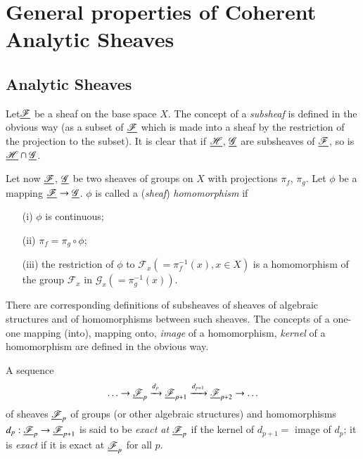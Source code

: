 \chapter{General properties of Coherent Analytic Sheaves}\label{chap12}

\section{Analytic Sheaves}\label{chap12:sec1}

Let\pageoriginale $\underline{\mathscr{F}}$ be a sheaf on the base space
$X$. The concept of a 
\textit{subsheaf} is defined in the obvious way (as a subset of
$\underline{\mathscr{F}}$ which is made into a sheaf by the restriction of the
projection to the subset). It is clear that if $\underline{\mathscr{H}}$,
$\underline{\mathscr{G}}$ are subsheaves of $\underline{\mathscr{F}}$, so is
$\underline{\mathscr{H}} \cap \underline{\mathscr{G}}$. 

Let now $\underline{\mathscr{F}}$, $\underline{\mathscr{G}}$ be two sheaves of groups on $X$
with projections $\pi_f$, $\pi_g$. Let $\phi$ be a mapping
$\underline{\mathscr{F}} \to \underline{\mathscr{G}}$. $\phi$ is called a
(\textit{sheaf}) 
\textit{homomorphism} if
\begin{itemize}
\item[(i)] $\phi$ is continuous;

\item[(ii)] $\pi_f = \pi_g \circ \phi$;

\item[(iii)] the restriction of $\phi$ to $\mathscr{F}_x(=
\pi^{-1}_f (x), x \in X)$ is a homomorphism of the group
$\mathscr{F}_x$ in $\mathscr{G}_x (= \pi^{-1}_g (x))$. 
\end{itemize}

There are corresponding definitions of subsheaves of sheaves of
algebraic structures and of homomorphisms between such sheaves. The
concepts of a one-one mapping (into), mapping onto, \textit{image} of
a homomorphism, \textit{kernel} of a homomorphism are defined in the
obvious way. 

A sequence
$$
\ldots \to \underline{\mathscr{F}}_p \xrightarrow{d_p} \underline{\mathscr{F}}_{p+1}
\xrightarrow{d_{p+1}} \underline{\mathscr{F}}_{p+2} \to \ldots
$$
of sheaves $\underline{\mathscr{F}}_p$ of groups (or other algebraic structures)
and homomorphisms $d_p : \underline{\mathscr{F}}_p \to \underline{\mathscr{F}}_{p+1}$ is said
to be \textit{exact at} $\underline{\mathscr{F}}_p$ if the kernel of $d_{p+1} = $
image of $d_p$; it is \textit{exact} if it is exact at $\underline{\mathscr{F}}_p$
for all $p$. 

